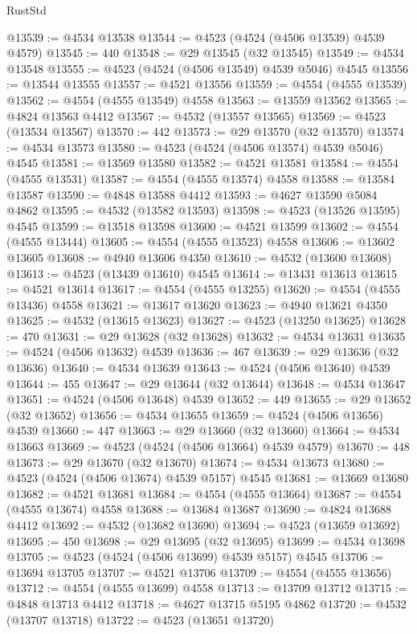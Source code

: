 \begin{lexlean}{RustStd}
\begin{coremodule}
@13539 := @4534 @13538
@13544 := @4523 (@4524 (@4506 @13539) @4539 @4579)
@13545 := 440
@13548 := @29 @13545 (@32 @13545)
@13549 := @4534 @13548
@13555 := @4523 (@4524 (@4506 @13549) @4539 @5046) @4545
@13556 := @13544 @13555
@13557 := @4521 @13556
@13559 := @4554 (@4555 @13539)
@13562 := @4554 (@4555 @13549) @4558
@13563 := @13559 @13562
@13565 := @4824 @13563 @4412
@13567 := @4532 (@13557 @13565)
@13569 := @4523 (@13534 @13567)
@13570 := 442
@13573 := @29 @13570 (@32 @13570)
@13574 := @4534 @13573
@13580 := @4523 (@4524 (@4506 @13574) @4539 @5046) @4545
@13581 := @13569 @13580
@13582 := @4521 @13581
@13584 := @4554 (@4555 @13531)
@13587 := @4554 (@4555 @13574) @4558
@13588 := @13584 @13587
@13590 := @4848 @13588 @4412
@13593 := @4627 @13590 @5084 @4862
@13595 := @4532 (@13582 @13593)
@13598 := @4523 (@13526 @13595) @4545
@13599 := @13518 @13598
@13600 := @4521 @13599
@13602 := @4554 (@4555 @13444)
@13605 := @4554 (@4555 @13523) @4558
@13606 := @13602 @13605
@13608 := @4940 @13606 @4350
@13610 := @4532 (@13600 @13608)
@13613 := @4523 (@13439 @13610) @4545
@13614 := @13431 @13613
@13615 := @4521 @13614
@13617 := @4554 (@4555 @13255)
@13620 := @4554 (@4555 @13436) @4558
@13621 := @13617 @13620
@13623 := @4940 @13621 @4350
@13625 := @4532 (@13615 @13623)
@13627 := @4523 (@13250 @13625)
@13628 := 470
@13631 := @29 @13628 (@32 @13628)
@13632 := @4534 @13631
@13635 := @4524 (@4506 @13632) @4539
@13636 := 467
@13639 := @29 @13636 (@32 @13636)
@13640 := @4534 @13639
@13643 := @4524 (@4506 @13640) @4539
@13644 := 455
@13647 := @29 @13644 (@32 @13644)
@13648 := @4534 @13647
@13651 := @4524 (@4506 @13648) @4539
@13652 := 449
@13655 := @29 @13652 (@32 @13652)
@13656 := @4534 @13655
@13659 := @4524 (@4506 @13656) @4539
@13660 := 447
@13663 := @29 @13660 (@32 @13660)
@13664 := @4534 @13663
@13669 := @4523 (@4524 (@4506 @13664) @4539 @4579)
@13670 := 448
@13673 := @29 @13670 (@32 @13670)
@13674 := @4534 @13673
@13680 := @4523 (@4524 (@4506 @13674) @4539 @5157) @4545
@13681 := @13669 @13680
@13682 := @4521 @13681
@13684 := @4554 (@4555 @13664)
@13687 := @4554 (@4555 @13674) @4558
@13688 := @13684 @13687
@13690 := @4824 @13688 @4412
@13692 := @4532 (@13682 @13690)
@13694 := @4523 (@13659 @13692)
@13695 := 450
@13698 := @29 @13695 (@32 @13695)
@13699 := @4534 @13698
@13705 := @4523 (@4524 (@4506 @13699) @4539 @5157) @4545
@13706 := @13694 @13705
@13707 := @4521 @13706
@13709 := @4554 (@4555 @13656)
@13712 := @4554 (@4555 @13699) @4558
@13713 := @13709 @13712
@13715 := @4848 @13713 @4412
@13718 := @4627 @13715 @5195 @4862
@13720 := @4532 (@13707 @13718)
@13722 := @4523 (@13651 @13720)

\end{coremodule}
\end{lexlean}
